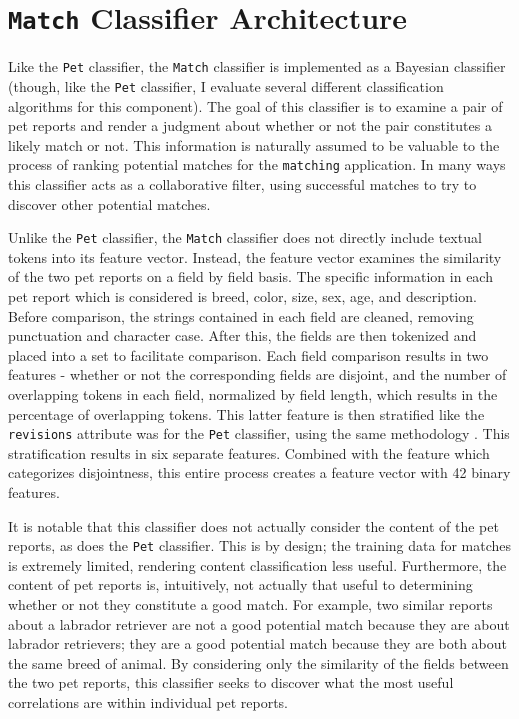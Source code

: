\section {{\tt Match} Classifier Architecture}

Like the {\tt Pet} classifier, the {\tt Match} classifier is implemented as a Bayesian classifier (though, like the {\tt Pet} classifier, I evaluate several different classification algorithms for this component).  The goal of this classifier is to examine a pair of pet reports and render a judgment about whether or not the pair constitutes a likely match or not.  This information is naturally assumed to be valuable to the process of ranking potential matches for the {\tt matching} application.  In many ways this classifier acts as a collaborative filter, using successful matches to try to discover other potential matches.

Unlike the {\tt Pet} classifier, the {\tt Match} classifier does not directly include textual tokens into its feature vector.  Instead, the feature vector examines the similarity of the two pet reports on a field by field basis.  The specific information in each pet report which is considered is breed, color, size, sex, age, and description.  Before comparison, the strings contained in each field are cleaned, removing punctuation and character case.  After this, the fields are then tokenized and placed into a set to facilitate comparison.  Each field comparison results in two features - whether or not the corresponding fields are disjoint, and the number of overlapping tokens in each field, normalized by field length, which results in the percentage of overlapping tokens.  This latter feature is then stratified like the {\tt revisions} attribute was for the {\tt Pet} classifier, using the same methodology \cite{macskassy:text}.  This stratification results in six separate features.  Combined with the feature which categorizes disjointness, this entire process creates a feature vector with 42 binary features.

It is notable that this classifier does not actually consider the content of the pet reports, as does the {\tt Pet} classifier.  This is by design; the training data for matches is extremely limited, rendering content classification less useful.  Furthermore, the content of pet reports is, intuitively, not actually that useful to determining whether or not they constitute a good match.  For example, two similar reports about a labrador retriever are not a good potential match because they are about labrador retrievers; they are a good potential match because they are both about the same breed of animal.  By considering only the similarity of the fields between the two pet reports, this classifier seeks to discover what the most useful correlations are within individual pet reports.

